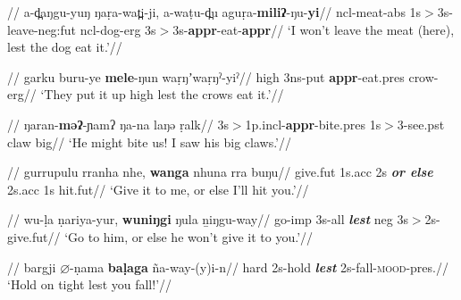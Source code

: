 \a\begingl\glpreamble {}//
\gla a-d̪aŋgu-yuŋ ŋaṛa-wat̪i-ji, a-waṭu-d̪u aguṛa-\textbf{miliʔ}-ŋu-\textbf{yi}//
\glb \gls{ncl}-meat-\gls{abs} 1s$\scriptscriptstyle>$3s-leave-\gls{neg}:\gls{fut} \gls{ncl}-dog-\gls{erg} 3s$\scriptscriptstyle>$3s-\textbf{\gls{appr}}-eat-\textbf{\gls{appr}}//
\glft`I won't leave the meat (here), lest the dog eat it.'//
\endgl




\a \begingl\glpreamble {}//
\gla garku buru-ye \textbf{mele}-ŋun waṛŋʼwaṛŋˀ-yiˀ//
\glb high 3ns-put \textbf{\gls{appr}}-eat.\gls{pres} crow-\gls{erg}//
\glft`They put it up high lest the crows eat it.'//
\endgl

\a \begingl\glpreamble {}//
\gla ŋaran-\textbf{mǝʔ}-ɲamʔ ŋa-na laŋǝ ṛalk//
\glb 3s$\scriptscriptstyle>$1p.\gls{incl}-\textbf{\gls{appr}}-bite.\gls{pres} 1s$\scriptscriptstyle>$3-see.\gls{pst} claw big//
\glft`He might bite us! I saw his big claws.'//
\endgl



\a\begingl\glpreamble{}//
\gla gurrupulu rranha nhe, \textbf{wanga} nhuna rra buŋu//
\glb give.\gls{fut} 1s.\gls{acc} 2s \textbf{\textit{or else}} 2s.\gls{acc} 1s hit.\gls{fut}//
\glft`Give it to me, or else I'll hit you.'//\endgl



\a\begingl\glpreamble {}//
\gla wu-ḷa ṇariya-yur, \textbf{wuniŋgi} ŋula ṉiŋgu-way//
\glb go-\gls{imp} 3s-\gls{all} \textit{\textbf{lest}} \gls{neg} 3s$\scriptscriptstyle>$2s-give.\gls{fut}//
\glft`Go to him, or else he won't give it to you.'//\endgl
 
\a\begingl\glpreamble {}//
\gla bargji $\varnothing$-ṇama \textbf{baḷaga} ña-way-(y)i-n//
\glb hard 2s-hold \textsl{\textbf{lest}} 2s-fall-\textsc{mood}-\gls{pres}.//
\glft`Hold on tight lest you  fall!'//
\endgl


\xe



